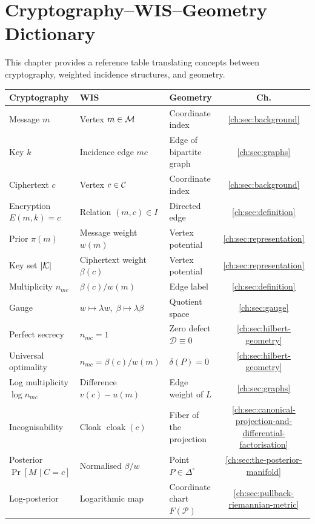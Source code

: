 \chapter[Dictionary]{Cryptography--WIS--Geometry Dictionary}\label{ch:sec:dictionary}

This chapter provides a reference table translating concepts between
cryptography, weighted incidence structures, and geometry.

\begin{center}
\begin{tabular}{p{3cm}p{3.5cm}p{3.5cm}c}
\hline
\textbf{Cryptography} & \textbf{WIS} & \textbf{Geometry} & \textbf{Ch.} \\
\hline
Message $m$ & Vertex $m\in\mathcal{M}$ & Coordinate index & \ref{ch:sec:background} \\
Key $k$ & Incidence edge $mc$ & Edge of bipartite graph & \ref{ch:sec:graphs} \\
Ciphertext $c$ & Vertex $c\in\mathcal{C}$ & Coordinate index & \ref{ch:sec:background} \\
Encryption $E(m,k)=c$ & Relation $(m,c)\in I$ & Directed edge & \ref{ch:sec:definition} \\
Prior $\pi(m)$ & Message weight $w(m)$ & Vertex potential & \ref{ch:sec:representation} \\
Key set $|\mathcal{K}|$ & Ciphertext weight $\beta(c)$ & Vertex potential & \ref{ch:sec:representation} \\
Multiplicity $n_{mc}$ & $\beta(c)/w(m)$ & Edge label & \ref{ch:sec:definition} \\
Gauge & $w\mapsto\lambda w,\;\beta\mapsto\lambda\beta$ & Quotient space & \ref{ch:sec:gauge} \\
Perfect secrecy & $n_{mc}=1$ & Zero defect $\mathcal D\equiv0$ & \ref{ch:sec:hilbert-geometry} \\
Universal optimality & $n_{mc}=\beta(c)/w(m)$ & $\delta(P)=0$ & \ref{ch:sec:hilbert-geometry} \\
Log multiplicity $\log n_{mc}$ & Difference $v(c)-u(m)$ & Edge weight of $L$ & \ref{ch:sec:graphs} \\
Incognisability & Cloak $\operatorname{cloak}(c)$ & Fiber of the projection & \ref{ch:sec:canonical-projection-and-differential-factorisation} \\
Posterior $\Pr[M\mid C=c]$ & Normalised $\beta/w$ & Point $P\in\Delta^\circ$ & \ref{ch:sec:the-posterior-manifold} \\
Log-posterior & Logarithmic map & Coordinate chart $F(\mathcal P)$ & \ref{ch:sec:pullback-riemannian-metric} \\

\end{tabular}
\end{center}
